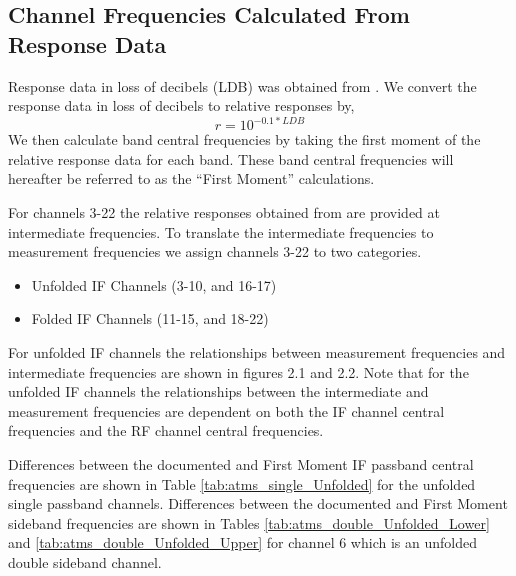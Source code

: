 \subsection{Channel Frequencies Calculated From Response Data}

Response data in loss of decibels (LDB) was obtained from \cite{ATMS_PFM_CalLog}. We convert the response data in loss of decibels to relative responses by, 
\begin{equation}
  r=10^{{-0.1*LDB}}    
\end{equation}
We then calculate band central frequencies by taking the first moment of the relative response data for each band. These band central frequencies will hereafter be referred to as the ``First Moment'' calculations.
 
For channels 3-22 the relative responses obtained from \cite{ATMS_PFM_CalLog} are provided at intermediate frequencies. 
To translate the intermediate frequencies to measurement frequencies we assign channels 3-22 to two categories. 

\begin{itemize}
  \item{Unfolded IF Channels (3-10, and 16-17)}
  \item{Folded IF Channels (11-15, and 18-22)}  
\end{itemize}

For unfolded IF channels the relationships between measurement frequencies and intermediate frequencies are shown in
figures 2.1 and 2.2. Note that for the unfolded IF channels the relationships between the intermediate
and measurement frequencies are dependent on both the IF channel central frequencies and the RF channel central frequencies.

Differences between the documented and First Moment IF passband central frequencies are shown in Table \ref{tab:atms_single_Unfolded} for the unfolded single passband channels. Differences between the documented and First Moment sideband frequencies are shown in Tables \ref{tab:atms_double_Unfolded_Lower} and \ref{tab:atms_double_Unfolded_Upper} for channel 6 which is an unfolded double sideband channel.

